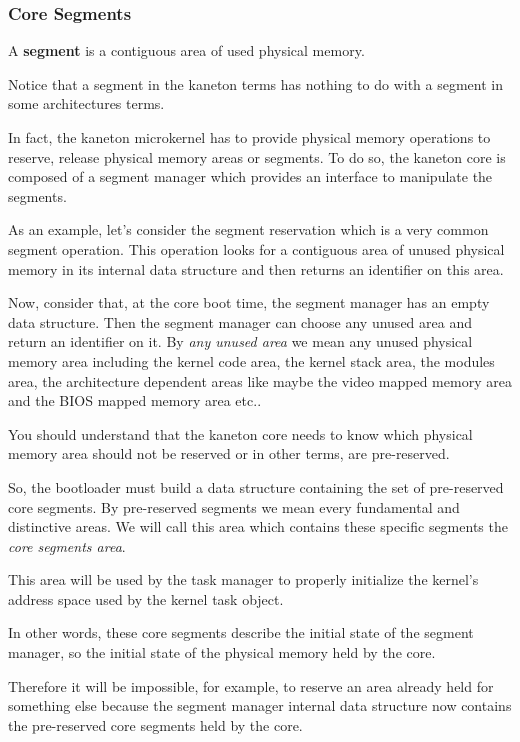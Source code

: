 \subsubsection{Core Segments}

A \textbf{segment} is a contiguous area of used physical memory.

Notice that a segment in the kaneton terms has nothing to do with
a segment in some architectures terms.

In fact, the kaneton microkernel has to provide physical memory operations to
reserve, release physical memory areas or segments. To do so, the kaneton
core is composed of a segment manager which provides an interface to
manipulate the segments.

As an example, let's consider the segment reservation which is a very
common segment operation. This operation looks for a contiguous area
of unused physical memory in its internal data structure and then
returns an identifier on this area.

Now, consider that, at the core boot time, the segment manager has
an empty data structure. Then the segment manager can choose any
unused area and return an identifier on it. By \textit{any unused area} we
mean any unused physical memory area including the kernel code area, the kernel
stack area, the modules area, the architecture dependent areas like maybe the
video mapped memory area and the BIOS mapped memory area etc..

You should understand that the kaneton core needs to know which physical
memory area should not be reserved or in other terms, are pre-reserved.

So, the bootloader must build a data structure containing the set of
pre-reserved core segments. By pre-reserved segments we mean every
fundamental and distinctive areas. We will call this area which
contains these specific segments the \textit{core segments area}.

This area will be used by the task manager to properly initialize
the kernel's address space used by the kernel task object.

In other words, these core segments describe the initial state of the
segment manager, so the initial state of the physical memory held by the
core.

Therefore it will be impossible, for example, to reserve an area
already held for something else because the segment manager internal
data structure now contains the pre-reserved core segments held by the
core.

